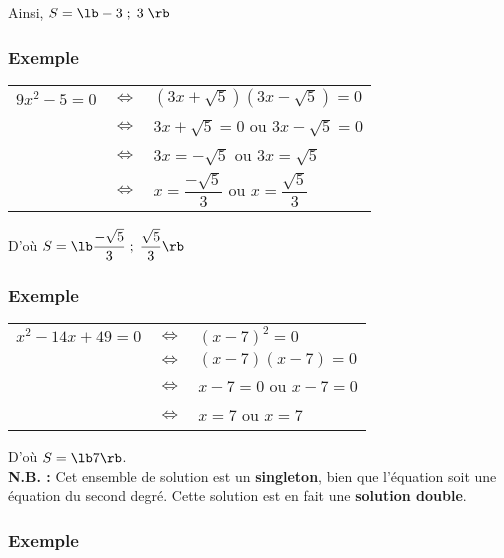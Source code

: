 Ainsi, $S = \lb -3 \; ; \; 3 \; \rb $

\subsubsection{Exemple }

\begin{tabular}{lll}
$ 9x^2 - 5 = 0$ & $\Longleftrightarrow$ & $\left(3x + \sqrt{5}\right)\left(3x - \sqrt{5}\right) = 0$ \\
& $\Longleftrightarrow$ & $3x + \sqrt{5} = 0 $ ou $3x - \sqrt{5} = 0$ \\
& $\Longleftrightarrow$ & $3x = -\sqrt{5}$ ou $3x = \sqrt{5}$ \\
& $\Longleftrightarrow$ & $x = \dfrac{-\sqrt{5}}{3} $ ou $x = \dfrac{\sqrt{5}}{3} $ \\
\end{tabular}

\vspace*{.3cm}

D'où $ S = \lb \dfrac{-\sqrt{5}}{3} \; ; \; \dfrac{\sqrt{5}}{3} \rb $

\subsubsection{Exemple }

\begin{tabular}{lll}
$x^2 - 14x + 49 = 0$ & $\Longleftrightarrow$ & $\left(x-7\right)^2 = 0 $\\
& $\Longleftrightarrow$ & $\left(x-7\right)\left(x-7\right) = 0$ \\
& $\Longleftrightarrow$ & $x-7 = 0$ ou $x-7 = 0$ \\
& $\Longleftrightarrow$ & $x = 7$ ou $x = 7$ \\
\end{tabular}

\vspace*{.3cm}

D'où $S = \lb 7 \rb $. \\

\textbf{N.B. :} Cet ensemble de solution est un \textbf{singleton}, bien que l'équation soit une équation du second degré. Cette solution est en fait une \textbf{solution double}.

\subsubsection{Exemple }

